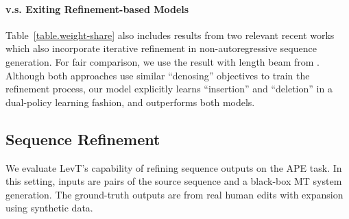 \documentclass{article}
\begin{document}
\paragraph{v.s. Exiting Refinement-based Models}
Table~\ref{table.weight-share} also includes results from two relevant recent works which also incorporate iterative refinement in non-autoregressive sequence generation.
For fair comparison,  we use the result with length beam  from \citet{levy2019constant}. Although both approaches use similar ``denosing'' objectives to train the refinement process, our model explicitly learns ``insertion'' and ``deletion'' in a dual-policy learning fashion, and outperforms both models.













\subsection{Sequence Refinement}
We evaluate LevT's capability of refining sequence outputs on the APE task. In this setting, inputs are pairs of the source sequence and a black-box MT system generation. The ground-truth outputs are from real human edits with expansion using synthetic data.


\label{sec:seq-ref}
\end{document}
